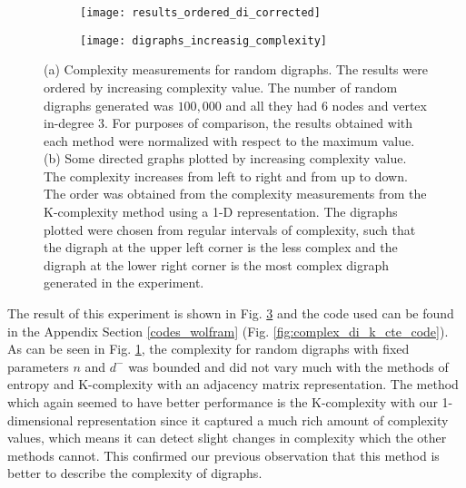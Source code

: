 \begin{figure}
	\centering
	\begin{subfigure}[b]{0.7\textwidth}
		\centering
		\texttt{[image: results\_ordered\_di\_corrected]}
		\caption{}
		\label{fig:results_ordered_di}
	\end{subfigure}
	\hfill
	\begin{subfigure}[b]{0.7\textwidth}
		\centering
		\texttt{[image: digraphs\_increasig\_complexity]}
		\caption{}
		\label{fig:digraphs_increasig_complexity}
	\end{subfigure}
	\caption[Complexity measurements for random digraphs.]{(a) Complexity measurements for random digraphs. The results were ordered by increasing complexity value. The number of random digraphs generated was $100,000$ and all they had $6$ nodes and vertex in-degree $3$. For purposes of comparison, the results obtained with each method were normalized with respect to the maximum value. (b) Some directed graphs plotted by increasing complexity value. The complexity increases from left to right and from up to down. The order was obtained from the complexity measurements from the K-complexity method using a 1-D representation. The digraphs plotted were chosen from regular intervals of complexity, such that the digraph at the upper left corner is the less complex and the digraph at the lower right corner is the most complex digraph generated in the experiment.}
	\label{fig:digraphs_increasig_complexity_results}
\end{figure}

The result of this experiment is shown in Fig. \ref{fig:digraphs_increasig_complexity_results} and the code used can be found in the Appendix Section \ref{codes_wolfram} (Fig. \ref{fig:complex_di_k_cte_code}). As can be seen in Fig. \ref{fig:results_ordered_di}, the complexity for random digraphs with fixed parameters $n$ and $ d^{-}$ was bounded and did not vary much with the methods of entropy and K-complexity with an adjacency matrix representation. The method which again seemed to have better performance is the K-complexity with our 1-dimensional representation since it captured a much rich amount of complexity values, which means it can detect slight changes in complexity which the other methods cannot. This confirmed our previous observation that this method is better to describe the complexity of digraphs.\\

